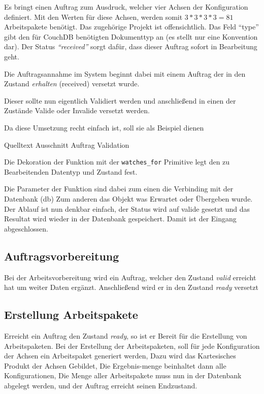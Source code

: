 Es bringt einen Auftrag zum Ausdruck, welcher vier Achsen der Konfiguration definiert.
Mit den Werten für diese Achsen, werden somit $3*3*3*3 = 81$ Arbeitspakete benötigt.
Das zugehörige Projekt ist offensichtlich. Das Feld ``type'' gibt den für CouchDB benötigten Dokumenttyp an (es stellt nur eine Konvention dar).
Der Status \textit{``received''} sorgt dafür, dass dieser Auftrag sofort in Bearbeitung geht.

\FloatBarrier
Die Auftragsannahme im System beginnt dabei mit einem Auftrag der in den Zustand \textit{erhalten} (received) versetzt wurde.

Dieser sollte nun eigentlich Validiert werden und anschließend in einen der Zustände Valide oder Invalide versetzt werden.

Da diese Umsetzung recht einfach ist, soll sie als Beispiel dienen
\begin{listing}[h]
\caption{Quelltext Ausschnitt Auftrag Validation}
\label{fig:auftrag-validation-code}
\end{listing}

Die Dekoration \cite{python:decorator}
der Funktion mit der \verb|watches_for| Primitive legt den zu Bearbeitenden Datentyp und Zustand fest.

Die Parameter der Funktion sind dabei zum einen die Verbinding mit der Datenbank
 (db)
Zum anderen das Objekt was Erwartet oder Übergeben wurde.
Der Ablauf ist nun denkbar einfach, der Status wird auf valide gesetzt und das Resultat wird wieder in der Datenbank gespeichert.
Damit ist der Eingang abgeschlossen.

\FloatBarrier
\subsection{Auftragsvorbereitung}

Bei der Arbeitsvorbereitung wird ein Auftrag,
welcher den Zustand \textit{valid} erreicht hat um weiter Daten ergänzt.
Anschließend wird er in den Zustand \textit{ready} versetzt

\subsection{Erstellung Arbeitspakete}

Erreicht ein Auftrag den Zustand \textit{ready}, so ist er Bereit für die Erstellung von Arbeitspaketen.
Bei der Erstellung der Arbeitspaketen, soll für jede Konfiguration der Achsen ein Arbeitspaket generiert werden,
Dazu wird das Kartesisches Produkt der Achsen Gebildet,
Die Ergebnis-menge beinhaltet dann alle Konfigurationen,
Die Menge aller Arbeitspakete muss nun in der Datenbank abgelegt werden,
und der Auftrag erreicht seinen Endzustand.

